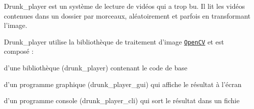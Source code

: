 Drunk\+\_\+player est un système de lecture de vidéos qui a trop bu. Il lit les vidéos contenues dans un dossier par morceaux, aléatoirement et parfois en transformant l'image.

Drunk\+\_\+player utilise la bibliothèque de traitement d'image \href{opencv.org}{\tt Open\+C\+V} et est composé \+: 
\begin{DoxyItemize}
\item d'une bibliothèque (drunk\+\_\+player) contenant le code de base  
\item d'un programme graphique (drunk\+\_\+player\+\_\+gui) qui affiche le résultat à l'écran  
\item d'un programme console (drunk\+\_\+player\+\_\+cli) qui sort le résultat dans un fichie  
\end{DoxyItemize}